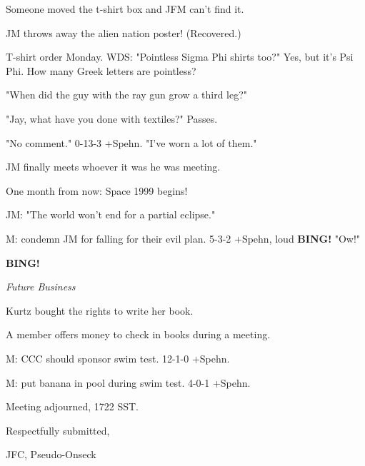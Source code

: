 \documentclass[12pt]{article}
\newcommand{\bing}{{\bf BING!} }
\newcommand{\goto}[1]{\bing \vskip 12pt \centerline{{\em{#1}}}}
\begin{document}
Someone moved the t-shirt box and JFM can't find it.

JM throws away the alien nation poster! (Recovered.)

T-shirt order Monday. WDS: "Pointless Sigma Phi shirts too?" Yes, but it's Psi Phi. How many Greek letters are pointless?

"When did the guy with the ray gun grow a third leg?"

"Jay, what have you done with textiles?" Passes.

"No comment." 0-13-3 +Spehn. "I've worn a lot of them."

JM finally meets whoever it was he was meeting.

One month from now: Space 1999 begins!

JM: "The world won't end for a partial eclipse."

M: condemn JM for falling for their evil plan. 5-3-2 +Spehn, loud \bing "Ow!"

\goto{Future Business}

Kurtz bought the rights to write her book.

A member offers money to check in books during a meeting.

M: CCC should sponsor swim test. 12-1-0 +Spehn.

M: put banana in pool during swim test. 4-0-1 +Spehn.

\vspace{12pt}

\noindent
Meeting adjourned, 1722 SST.

\vspace{18pt}

\centerline{Respectfully submitted,}
\centerline{JFC, Pseudo-Onseck}
\end{document}
